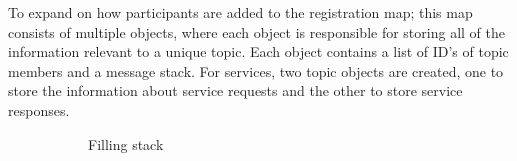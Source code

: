         To expand on how participants are added to the registration map; this map consists of multiple objects, where each object is responsible for storing all of the information relevant to a unique topic. Each object contains a list of ID's of topic members and a message stack. For services, two topic objects are created, one to store the information about service requests and the other to store service responses.

        

        \begin{figure}[htbp]
            \centering
            \vspace{1em}
            \begin{subfigure}[t]{0.32\textwidth}
                \centering
                \caption{Filling stack}
            \end{subfigure}
            \begin{subfigure}[t]{0.32\textwidth}
                \centering
\end{subfigure}
\end{figure}
